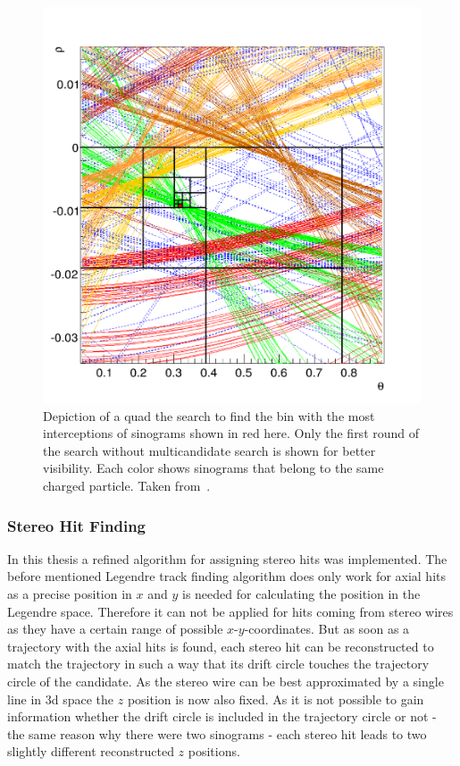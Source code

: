 \begin{figure}
  \centering
  \includegraphics[width=0.5\linewidth]{figures/theory/quad_tree.png}
  \caption[Quad tree search.]{Depiction of a quad the search to find the bin with the most interceptions of sinograms shown in red here. Only the first round of the search without multicandidate search is shown for better visibility. Each color shows sinograms that belong to the same charged particle. Taken from~\cite{viktor_dpg}.}
  \label{fig-quad-tree-search}
\end{figure}


\subsubsection{Stereo Hit Finding}

In this thesis a refined algorithm for assigning stereo hits was implemented. The before mentioned Legendre track finding algorithm does only work for axial hits as a precise position in $x$ and $y$ is needed for calculating the position in the Legendre space. Therefore it can not be applied for hits coming from stereo wires as they have a certain range of possible $x$-$y$-coordinates. But as soon as a trajectory with the axial hits is found, each stereo hit can be reconstructed to match the trajectory in such a way that its drift circle touches the trajectory circle of the candidate. As the stereo wire can be best approximated by a single line in 3d space the $z$ position is now also fixed. As it is not possible to gain information whether the drift circle is included in the trajectory circle or not - the same reason why there were two sinograms - each stereo hit leads to two slightly different reconstructed $z$ positions. 

